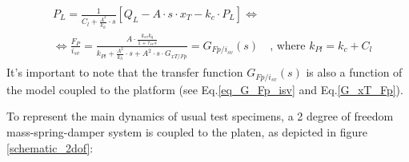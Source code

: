 \documentclass[  10pt, twoside]{report} %
\numberwithin{equation}{chapter}
\begin{document}
\begin{align}\label{eq_G_Fp_isv}
    \begin{aligned}
    & P_L = \frac{1}{C_l + \frac{A^2}{k_h}\cdot s} [Q_L - A \cdot s \cdot x_T - k_c \cdot P_L] \Longleftrightarrow \\
    & \Longleftrightarrow \frac{F_P}{i_{sv}} = \frac{A \cdot \frac{k_{sv} k_q}{1 + \tau_{sv} s} } {  k_{Pl} + \frac{A^2}{k_h}\cdot s  + A^2\cdot s \cdot G_{xT/Fp}} = G_{Fp/i_{sv}}(s) \quad \text{, where $k_{Pl}=k_c + C_l$}
    \end{aligned}
\end{align}
It's important to note that the transfer function $G_{Fp/i_{sv}}(s)$  is also a function of the model coupled to the platform (see Eq.\eqref{eq_G_Fp_isv} and  Eq.\eqref{G_xT_Fp}).

To represent the main dynamics of usual test specimens, a 2 degree of freedom mass-spring-damper system is coupled to the platen, as depicted in figure \ref{schematic_2dof}:
\end{document}
